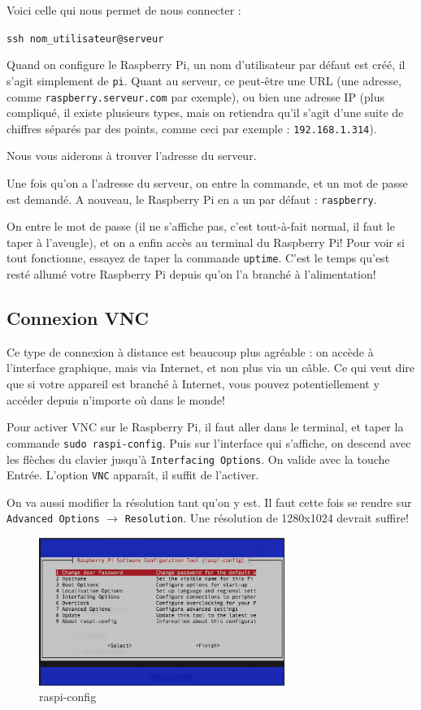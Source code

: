Voici celle qui nous permet de nous connecter :

\texttt{ssh nom\_utilisateur@serveur}

Quand on configure le Raspberry Pi, un nom d'utilisateur par défaut est créé, il s'agit simplement de \texttt{pi}. Quant au serveur, ce peut-être une URL (une adresse, comme \texttt{raspberry.serveur.com} par exemple), ou bien une adresse IP (plus compliqué, il existe plusieurs types, mais on retiendra qu'il s'agit d'une suite de chiffres séparés par des points, comme ceci par exemple : \texttt{192.168.1.314}).

Nous vous aiderons à trouver l'adresse du serveur.

Une fois qu'on a l'adresse du serveur, on entre la commande, et un mot de passe est demandé. A nouveau, le Raspberry Pi en a un par défaut : \texttt{raspberry}.

On entre le mot de passe (il ne s'affiche pas, c'est tout-à-fait normal, il faut le taper à l'aveugle), et on a enfin accès au terminal du Raspberry Pi! Pour voir si tout fonctionne, essayez de taper la commande \texttt{uptime}. C'est le temps qu'est resté allumé votre Raspberry Pi depuis qu'on l'a branché à l'alimentation!

\subsection{Connexion VNC}

Ce type de connexion à distance est beaucoup plus agréable : on accède à l'interface graphique, mais via Internet, et non plus via un câble. Ce qui veut dire que si votre appareil est branché à Internet, vous pouvez potentiellement y accéder depuis n'importe où dans le monde!

Pour activer VNC sur le Raspberry Pi, il faut aller dans le terminal, et taper la commande \texttt{sudo raspi-config}. Puis sur l'interface qui s'affiche, on descend avec les flèches du clavier jusqu'à \texttt{Interfacing Options}. On valide avec la touche Entrée. L'option \texttt{VNC} apparaît, il suffit de l'activer.

On va aussi modifier la résolution tant qu'on y est. Il faut cette fois se rendre sur \texttt{Advanced Options} $\rightarrow$ \texttt{Resolution}. Une résolution de 1280x1024 devrait suffire!

\begin{figure}[h!]
\begin{center}
\includegraphics[width=8cm]{raspi-config.png}
\end{center}
\caption{raspi-config}
\label{raspi-config}
\end{figure}

